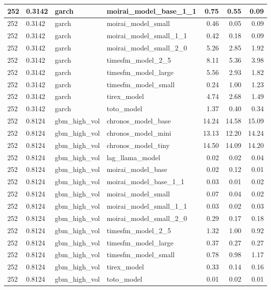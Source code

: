 {\begin{tabular}{llllrrr}
\midrule
252 & 0.3142 & garch & moirai\_model\_base\_1\_1 & 0.75 & 0.55 & 0.09 \\
\midrule
252 & 0.3142 & garch & moirai\_model\_small & 0.46 & 0.05 & 0.09 \\
\midrule
252 & 0.3142 & garch & moirai\_model\_small\_1\_1 & 0.42 & 0.18 & 0.09 \\
\midrule
252 & 0.3142 & garch & moirai\_model\_small\_2\_0 & 5.26 & 2.85 & 1.92 \\
\midrule
252 & 0.3142 & garch & timesfm\_model\_2\_5 & 8.11 & 5.36 & 3.98 \\
\midrule
252 & 0.3142 & garch & timesfm\_model\_large & 5.56 & 2.93 & 1.82 \\
\midrule
252 & 0.3142 & garch & timesfm\_model\_small & 0.24 & 1.00 & 1.23 \\
\midrule
252 & 0.3142 & garch & tirex\_model & 4.74 & 2.68 & 1.49 \\
\midrule
252 & 0.3142 & garch & toto\_model & 1.37 & 0.40 & 0.34 \\
\midrule
252 & 0.8124 & gbm\_high\_vol & chronos\_model\_base & 14.24 & 14.58 & 15.09 \\
\midrule
252 & 0.8124 & gbm\_high\_vol & chronos\_model\_mini & 13.13 & 12.20 & 14.24 \\
\midrule
252 & 0.8124 & gbm\_high\_vol & chronos\_model\_tiny & 14.50 & 14.09 & 14.20 \\
\midrule
252 & 0.8124 & gbm\_high\_vol & lag\_llama\_model & 0.02 & 0.02 & 0.04 \\
\midrule
252 & 0.8124 & gbm\_high\_vol & moirai\_model\_base & 0.02 & 0.12 & 0.01 \\
\midrule
252 & 0.8124 & gbm\_high\_vol & moirai\_model\_base\_1\_1 & 0.03 & 0.01 & 0.02 \\
\midrule
252 & 0.8124 & gbm\_high\_vol & moirai\_model\_small & 0.07 & 0.04 & 0.02 \\
\midrule
252 & 0.8124 & gbm\_high\_vol & moirai\_model\_small\_1\_1 & 0.03 & 0.02 & 0.03 \\
\midrule
252 & 0.8124 & gbm\_high\_vol & moirai\_model\_small\_2\_0 & 0.29 & 0.17 & 0.18 \\
\midrule
252 & 0.8124 & gbm\_high\_vol & timesfm\_model\_2\_5 & 1.32 & 1.00 & 0.92 \\
\midrule
252 & 0.8124 & gbm\_high\_vol & timesfm\_model\_large & 0.37 & 0.27 & 0.27 \\
\midrule
252 & 0.8124 & gbm\_high\_vol & timesfm\_model\_small & 0.78 & 0.98 & 1.17 \\
\midrule
252 & 0.8124 & gbm\_high\_vol & tirex\_model & 0.33 & 0.14 & 0.16 \\
\midrule
252 & 0.8124 & gbm\_high\_vol & toto\_model & 0.01 & 0.02 & 0.01 \\
\bottomrule
\end{tabular}
}